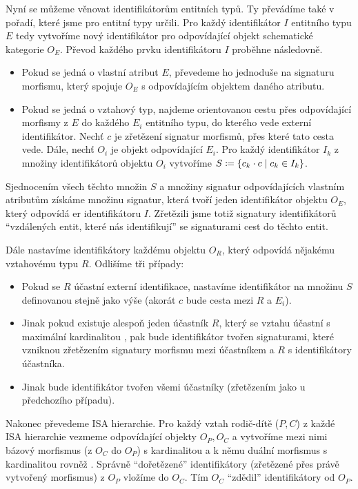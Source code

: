 Nyní se můžeme věnovat identifikátorům entitních typů.
Ty převádíme také v pořadí, které jsme pro entitní typy určili.
Pro každý identifikátor $I$ entitního typu $E$ tedy vytvoříme nový identifikátor pro odpovídající objekt schematické kategorie $O_E$.
Převod každého prvku identifikátoru $I$ proběhne následovně.
\begin{itemize}
  \item Pokud se jedná o vlastní atribut $E$, převedeme ho jednoduše na signaturu morfismu, který spojuje $O_E$ s odpovídajícím objektem daného atributu.
  \item Pokud se jedná o vztahový typ, najdeme orientovanou cestu přes odpovídající morfismy z $E$ do každého $E_i$ entitního typu, do kterého vede externí identifikátor.
        Nechť $c$ je zřetězení signatur morfismů, přes které tato cesta vede.
        Dále, nechť $O_i$ je objekt odpovídající $E_i$.
        Pro každý identifikátor $I_k$ z množiny identifikátorů objektu $O_i$ vytvoříme $S\coloneqq \left\{c_k\cdot c\mid c_k\in I_k\right\}$.
\end{itemize}
Sjednocením všech těchto množin $S$ a množiny signatur odpovídajících vlastním atributům získáme množinu signatur, která tvoří jeden identifikátor objektu $O_E$, který odpovídá \acrshort{er} identifikátoru $I$.
Zřetězili jsme totiž signatury identifikátorů \enquote{vzdálených entit, které nás identifikují} se signaturami cest do těchto entit.

Dále nastavíme identifikátory každému objektu $O_R$, který odpovídá nějakému vztahovému typu $R$.
Odlišíme tři případy:
\begin{itemize}
  \item Pokud se $R$ účastní externí identifikace, nastavíme identifikátor na množinu $S$ definovanou stejně jako výše (akorát $c$ bude cesta mezi $R$ a $E_i$).
  \item Jinak pokud existuje alespoň jeden účastník $R$, který se vztahu účastní s maximální kardinalitou \one, pak bude identifikátor tvořen signaturami, které vzniknou zřetězením signatury morfismu mezi účastníkem a $R$ s identifikátory účastníka.
  \item Jinak bude identifikátor tvořen všemi účastníky (zřetězením jako u předchozího případu).
\end{itemize}

Nakonec převedeme ISA hierarchie.
Pro každý vztah rodič-dítě ($P, C$) z každé ISA hierarchie vezmeme odpovídající objekty $O_P, O_C$ a vytvoříme mezi nimi bázový morfismus (z $O_C$ do $O_P$) s kardinalitou \oneone{} a k němu duální morfismus s kardinalitou rovněž \oneone{}.
Správně \enquote{dořetězené} identifikátory (zřetězené přes právě vytvořený morfismus) z $O_P$ vložíme do $O_C$.
Tím $O_C$ \enquote{zdědil} identifikátory od $O_P$.

